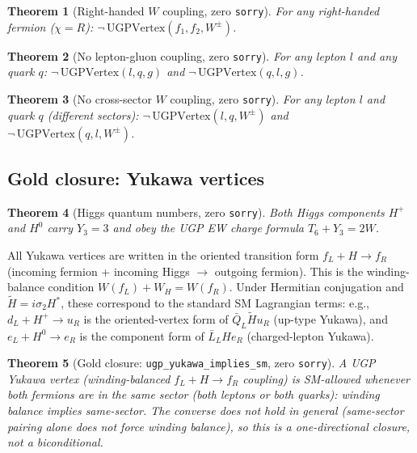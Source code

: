 \documentclass[12pt]{article}
\newtheorem{theorem}{Theorem}[section]
\theoremstyle{remark}
\newcommand{\YY}{Y_3}
\newcommand{\TT}{T_6}
\newcommand{\sorry}{\texttt{sorry}}
\newcommand{\lean}[1]{\texttt{#1}}
\begin{document}
\begin{theorem}[Right-handed $W$ coupling, zero \sorry]
For any right-handed fermion ($\chi = R$):
$\neg\, \mathrm{UGPVertex}(f_1, f_2, W^\pm)$.
\end{theorem}

\begin{theorem}[No lepton-gluon coupling, zero \sorry]
For any lepton $l$ and any quark $q$:
$\neg\, \mathrm{UGPVertex}(l, q, g)$ and
$\neg\, \mathrm{UGPVertex}(q, l, g)$.
\end{theorem}

\begin{theorem}[No cross-sector $W$ coupling, zero \sorry]
For any lepton $l$ and quark $q$ (different sectors):
$\neg\, \mathrm{UGPVertex}(l, q, W^\pm)$ and
$\neg\, \mathrm{UGPVertex}(q, l, W^\pm)$.
\end{theorem}

\subsection{Gold closure: Yukawa vertices}

\begin{theorem}[Higgs quantum numbers, zero \sorry]
Both Higgs components $H^+$ and $H^0$ carry $\YY = 3$ and obey the UGP EW
charge formula $\TT + \YY = 2W$.
\end{theorem}

\begin{tcolorbox}[colback=blue!4,colframe=blue!40,title=\textbf{Yukawa orientation convention}]
All Yukawa vertices are written in the oriented transition form $f_L + H \to
f_R$ (incoming fermion + incoming Higgs $\to$ outgoing fermion).  This is the
winding-balance condition $W(f_L) + W_H = W(f_R)$.  Under Hermitian conjugation
and $\tilde H = i\sigma_2 H^*$, these correspond to the standard SM Lagrangian
terms: e.g., $d_L + H^+ \to u_R$ is the oriented-vertex form of
$\bar Q_L \tilde H u_R$ (up-type Yukawa), and $e_L + H^0 \to e_R$ is the
component form of $\bar L_L H e_R$ (charged-lepton Yukawa).
\end{tcolorbox}

\begin{theorem}[Gold closure: \lean{ugp\_yukawa\_implies\_sm}, zero \sorry]
\label{thm:gold}
A UGP Yukawa vertex (winding-balanced $f_L + H \to f_R$ coupling) is SM-allowed
whenever both fermions are in the same sector (both leptons or both quarks):
winding balance implies same-sector.  The converse does not hold in general
(same-sector pairing alone does not force winding balance), so this is a
one-directional closure, not a biconditional.
\end{theorem}
\end{document}

